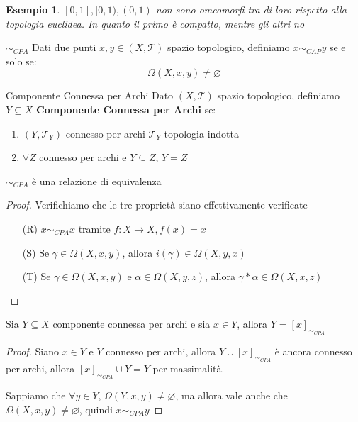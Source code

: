 \documentclass[11pt,a4paper,twoside]{article}
\newtheorem{es}{Esempio}
\theoremstyle{definition}
\begin{document}
\begin{es}
	$[0,1], [0,1), (0,1)$ non sono omeomorfi tra di loro rispetto alla topologia euclidea. In quanto il primo è compatto, mentre gli altri no
\end{es}

\begin{defn}{$\sim_{CPA}$}{}
	Dati due punti $x,y \in (X, \mathcal T)$ spazio topologico, definiamo $x \sim_{CAP}y$ se e solo se:
	\[ \Omega(X, x, y)\neq \varnothing \]
\end{defn}

\begin{defn}{Componente Connessa per Archi}{}
	Dato $(X, \mathcal T)$ spazio topologico, definiamo $Y \subseteq X$ \textbf{Componente Connessa per Archi} se:
	\begin{enumerate}
		\item $(Y, \mathcal T_Y)$ connesso per archi $\mathcal T_Y$ topologia indotta
		\item $\forall Z$ connesso per archi e $Y \subseteq Z$, $Y = Z$
	\end{enumerate}
\end{defn}

\begin{prop}{}{}
	$\sim_{CPA}$ è una relazione di equivalenza
\end{prop}
\begin{proof}
	Verifichiamo che le tre proprietà siano effettivamente verificate
	\begin{itemize}
		\item[(R)] $x \sim_{CPA} x$ tramite $f:X \to X, f(x) = x$
		\item[(S)] Se $\gamma \in \Omega(X, x, y)$, allora $i(\gamma) \in \Omega(X, y, x)$
		\item[(T)] Se $\gamma \in \Omega(X, x, y)$ e $\alpha \in \Omega(X, y, z)$, allora $\gamma *\alpha \in \Omega(X, x, z)$
	\end{itemize}
\end{proof}

\begin{prop}{}{}
	Sia $Y\subseteq X$ componente connessa per archi e sia $x \in Y$, allora $Y = [x]_{\sim_{CPA}}$
\end{prop}
\begin{proof}
	 Siano $x \in Y$ e $Y$ connesso per archi, allora $Y \cup [x]_{\sim_{CPA}}$ è ancora connesso per archi, allora $[x]_{\sim_{CPA}}\cup Y = Y$ per massimalità.

	 Sappiamo che $\forall y \in Y$, $\Omega(Y, x, y)\neq \varnothing$, ma allora vale anche che $\Omega(X, x, y)\neq \varnothing$, quindi $x \sim_{CPA} y$
\end{proof}
\end{document}
